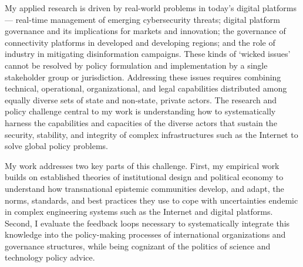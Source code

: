 My applied research is driven by real-world problems in today's digital platforms---%
  real-time management of emerging cybersecurity threats; 
  digital platform governance and its implications for markets and innovation; 
  the governance of connectivity platforms in developed and developing regions; and 
  the role of industry in mitigating disinformation campaigns.
%
These kinds of `wicked issues' cannot be resolved by policy formulation and implementation by a single stakeholder group or jurisdiction.
%
Addressing these issues requires combining technical, operational, organizational, and legal capabilities distributed among equally diverse sets of state and non-state, private actors.
%
The research and policy challenge central to my work is understanding how to systematically harness the capabilities and capacities of the diverse actors that sustain the security, stability, and integrity of complex infrastructures such as the Internet to solve global policy problems.
%
%
%

My work addresses two key parts of this challenge. 
%
First, my empirical work builds on established theories of institutional design and political economy to understand how transnational epistemic communities develop, and adapt, the norms, standards, and best practices they use to cope with uncertainties endemic in complex engineering systems such as the Internet and digital platforms.
%
Second, I evaluate the feedback loops necessary to systematically integrate this knowledge into the policy-making processes of international organizations and governance structures, while being cognizant of the politics of science and technology policy advice.
%
